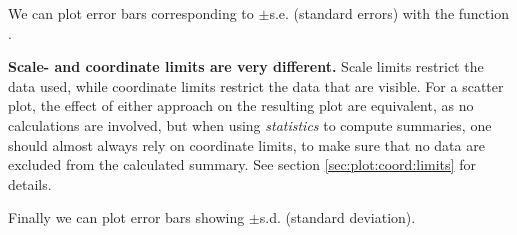 \documentclass[krantz2]{krantz}\usepackage{knitr}%
\begin{document}
\begin{knitrout}\footnotesize
{}\color{fgcolor}\begin{kframe}
\begin{alltt}
  \hlstd{(} \hlstd{=} \hlstd{,}
                \hlstd{=} \hlstd{(} \hlstd{=} \hlstd{),}
                \hlstd{=} \hlstd{,}  \hlstd{=} \hlstd{,}  \hlstd{=} \hlstd{)}
\end{alltt}
\end{kframe}
\end{knitrout}

We can plot error bars corresponding to $\pm$s.e. (standard errors) with the function .

\begin{knitrout}\footnotesize
{}\color{fgcolor}\begin{kframe}
\begin{alltt}
  \hlstd{(} \hlstd{=} \hlstd{,}
                \hlstd{=} \hlstd{,}  \hlstd{=} \hlstd{,}  \hlstd{=} \hlstd{)}
\end{alltt}
\end{kframe}
\end{knitrout}

\begin{warningbox}\label{box:plot:coord:lims}
\textbf{Scale- and coordinate limits are very different.} Scale limits restrict the data used, while coordinate limits restrict the data that are visible. For a scatter plot, the effect of either approach on the resulting plot are equivalent, as no calculations are involved, but when using \emph{statistics} to compute summaries, one should almost always rely on coordinate limits, to make sure that no data are excluded from the calculated summary. See section \ref{sec:plot:coord:limits} for details.
\end{warningbox}

Finally we can plot error bars showing $\pm$s.d. (standard deviation).

\begin{knitrout}\footnotesize
{}\color{fgcolor}\begin{kframe}
\begin{alltt}
  \hlstd{(} \hlstd{=} \hlstd{,}  \hlstd{=} \hlstd{,}  \hlstd{=} \hlstd{,}  \hlstd{=} \hlstd{)}
\end{alltt}
\end{kframe}
\end{knitrout}
\end{document}
